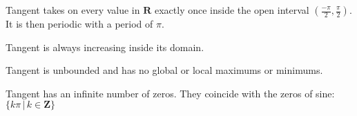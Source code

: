 \documentclass{ximera}
\begin{document}
Tangent takes on every value in $\textbf{R}$ exactly once inside the open interval $\left( \frac{-\pi}{2}, \frac{\pi}{2} \right)$.  It is then periodic with a period of $\pi$.

Tangent is always increasing inside its domain.

Tangent is unbounded and has no global or local maximums or minimums.

Tangent has an infinite number of zeros. They coincide with the zeros of sine: $\{  k \pi    \, | \,   k \in \textbf{Z}        \}$
\end{document}
